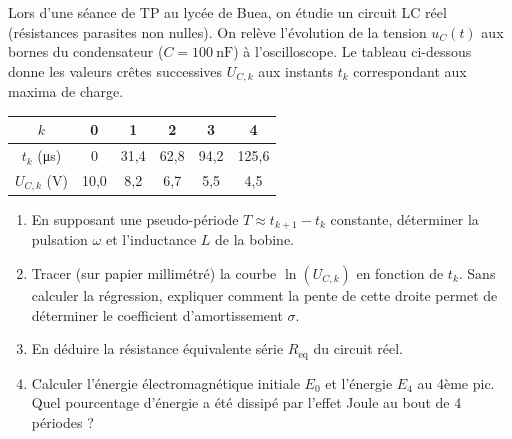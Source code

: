 \documentclass[11pt]{article}
\begin{document}
\begin{exercice}
Lors d'une séance de TP au lycée de Buea, on étudie un circuit LC réel (résistances parasites non nulles). On relève l'évolution de la tension $u_C(t)$ aux bornes du condensateur ($C = \SI{100}{\nano\farad}$) à l'oscilloscope. Le tableau ci-dessous donne les valeurs crêtes successives $U_{C,k}$ aux instants $t_k$ correspondant aux maxima de charge.

\begin{center}
\begin{tabular}{|c|c|c|c|c|c|}
\hline
$k$ & 0 & 1 & 2 & 3 & 4 \\
\hline
$t_k$ (\si{\micro\second}) & 0 & 31,4 & 62,8 & 94,2 & 125,6 \\
\hline
$U_{C,k}$ (\si{\volt}) & 10,0 & 8,2 & 6,7 & 5,5 & 4,5 \\
\hline
\end{tabular}
\end{center}

\begin{enumerate}
    \item En supposant une pseudo-période $T \approx t_{k+1}-t_k$ constante, déterminer la pulsation $\omega$ et l'inductance $L$ de la bobine.
    \item Tracer (sur papier millimétré) la courbe $\ln(U_{C,k})$ en fonction de $t_k$. Sans calculer la régression, expliquer comment la pente de cette droite permet de déterminer le coefficient d'amortissement $\sigma$.
    \item En déduire la résistance équivalente série $R_{\text{eq}}$ du circuit réel.
    \item Calculer l'énergie électromagnétique initiale $E_0$ et l'énergie $E_4$ au 4ème pic. Quel pourcentage d'énergie a été dissipé par l'effet Joule au bout de 4 périodes ?
\end{enumerate}
\end{exercice}
\end{document}
